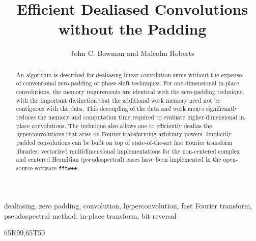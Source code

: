 \documentclass[final]{siamltex}
\begin{document}
\title{Efficient Dealiased Convolutions without the Padding}
\author{John C. Bowman and Malcolm Roberts}
\maketitle

\begin{abstract}
An algorithm is described for dealiasing linear convolution sums
without the expense of conventional zero-padding or phase-shift
techniques. For one-dimensional in-place convolutions, the memory
requirements are identical with the zero-padding technique, with the important
distinction that the additional work memory need not be contiguous with the
data. This decoupling of the data and work arrays significantly reduces
the memory and computation time required to evaluate higher-dimensional
in-place convolutions. The technique also allows one to efficiently dealias the
hyperconvolutions that arise on Fourier transforming arbitrary powers.
Implicitly padded convolutions can be built on top of state-of-the-art
fast Fourier transform libraries: vectorized multidimensional implementations
for the non-centered complex and centered Hermitian (pseudospectral) cases have
been implemented in the open-source software {\tt fftw++}.
\end{abstract} 

\begin{keywords} 
dealiasing, zero padding, convolution, hyperconvolution, fast Fourier transform,
pseudospectral method, in-place transform, bit reversal
\end{keywords}

\begin{AMS}
65R99,65T50
\end{AMS}

\pagestyle{myheadings}



% 



\end{document}

